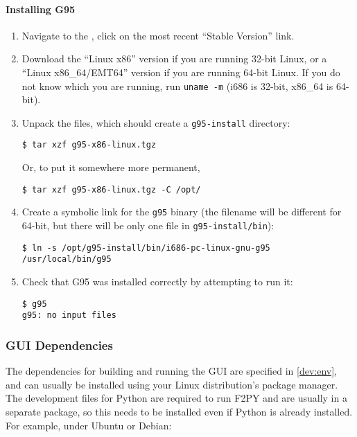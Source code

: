 \paragraph{Installing G95}

\begin{enumerate}

\item Navigate to the , click on the 
most recent ``Stable Version'' link.

\item Download the ``Linux x86'' version if you are running 32-bit Linux, or a ``Linux 
x86\_64/EMT64'' version if you are running 64-bit Linux.  If you do not know which you are running, 
run \verb|uname -m| (i686 is 32-bit, x86\_64 is 64-bit).

\item Unpack the files, which should create a \verb|g95-install| directory:
\begin{lstlisting}
$ tar xzf g95-x86-linux.tgz
\end{lstlisting}
Or, to put it somewhere more permanent,
\begin{lstlisting}
$ tar xzf g95-x86-linux.tgz -C /opt/
\end{lstlisting}

\item Create a symbolic link for the \verb|g95| binary (the filename will be different for 64-bit, 
but there will be only one file in \verb|g95-install/bin|):
\begin{lstlisting}
$ ln -s /opt/g95-install/bin/i686-pc-linux-gnu-g95 /usr/local/bin/g95
\end{lstlisting}

\item Check that G95 was installed correctly by attempting to run it:
\begin{lstlisting}
$ g95
g95: no input files
\end{lstlisting}

\end{enumerate}


\subsubsection{GUI Dependencies}

The dependencies for building and running the GUI are specified in \ref{dev:env}, and can usually be 
installed using your Linux distribution's package manager.  The development files for Python are 
required to run F2PY and are usually in a separate package, so this needs to be installed even if 
Python is already installed.  For example, under Ubuntu or Debian:

